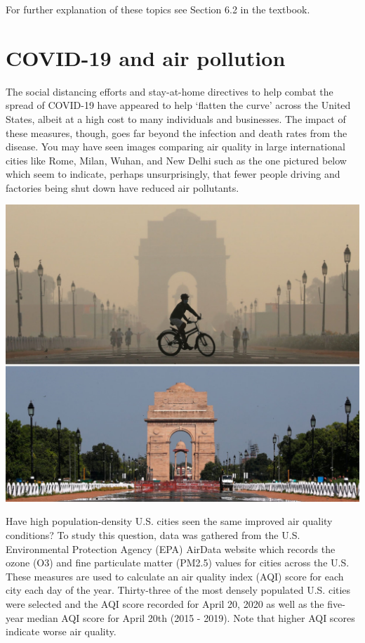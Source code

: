 \documentclass[
]{report}
\begin{document}
For further explanation of these topics see Section 6.2 in the textbook.

\hypertarget{covid-19-and-air-pollution-1}{%
\section{COVID-19 and air pollution}\label{covid-19-and-air-pollution-1}}

The social distancing efforts and stay-at-home directives to help combat the spread of COVID-19 have appeared to help `flatten the curve' across the United States, albeit at a high cost to many individuals and businesses. The impact of these measures, though, goes far beyond the infection and death rates from the disease. You may have seen images comparing air quality in large international cities like Rome, Milan, Wuhan, and New Delhi such as the one pictured below which seem to indicate, perhaps unsurprisingly, that fewer people driving and factories being shut down have reduced air pollutants.

\includegraphics{images/air_pollution.png}

Have high population-density U.S. cities seen the same improved air quality conditions? To study this question, data was gathered from the U.S. Environmental Protection Agency (EPA) AirData website which records the ozone (O3) and fine particulate matter (PM2.5) values for cities across the U.S. These measures are used to calculate an air quality index (AQI) score for each city each day of the year. Thirty-three of the most densely populated U.S. cities were selected and the AQI score recorded for April 20, 2020 as well as the five-year median AQI score for April 20th (2015 - 2019). Note that higher AQI scores indicate worse air quality.
\end{document}
